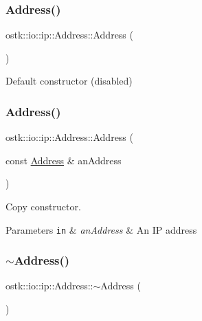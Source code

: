 \subsubsection{\texorpdfstring{Address()}{Address()}\hspace{0.1cm}{\footnotesize\ttfamily [1/2]}}
{\footnotesize\ttfamily ostk\+::io\+::ip\+::\+Address\+::\+Address (\begin{DoxyParamCaption}{ }\end{DoxyParamCaption})\hspace{0.3cm}{\ttfamily [delete]}}



Default constructor (disabled) 

\mbox{\label{classostk_1_1io_1_1ip_1_1_address_a003f6a3d8c0c53a27a72cbb7a5cabdca}} 
\subsubsection{\texorpdfstring{Address()}{Address()}\hspace{0.1cm}{\footnotesize\ttfamily [2/2]}}
{\footnotesize\ttfamily ostk\+::io\+::ip\+::\+Address\+::\+Address (\begin{DoxyParamCaption}\item[{const \hyperlink{classostk_1_1io_1_1ip_1_1_address}{Address} \&}]{an\+Address }\end{DoxyParamCaption})}



Copy constructor. 


\begin{DoxyParams}[1]{Parameters}
\mbox{\tt in}  & {\em an\+Address} & An IP address \\
\hline
\end{DoxyParams}
\mbox{\label{classostk_1_1io_1_1ip_1_1_address_abd301573be1c4ea9f2dbed8556654304}} 
\subsubsection{\texorpdfstring{$\sim$\+Address()}{~Address()}}
{\footnotesize\ttfamily ostk\+::io\+::ip\+::\+Address\+::$\sim$\+Address (\begin{DoxyParamCaption}{ }\end{DoxyParamCaption})}



